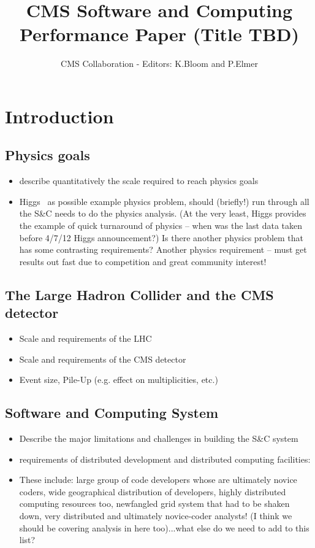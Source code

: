 \documentclass [draft,notitlepage] {article}
\title{CMS Software and Computing Performance Paper (Title TBD)}
\author{CMS Collaboration - Editors: K.Bloom and P.Elmer}
\begin{document}
\maketitle

\section{Introduction}

\subsection {Physics goals} 

\begin{itemize}
\item describe quantitatively the scale required to reach physics goals
\item Higgs~\cite{CMSHIGGS} as possible example physics problem, should (briefly!) run through all the S\&C needs to do the physics analysis.  (At the very least, Higgs provides the example of quick turnaround of physics -- when was the last data taken before 4/7/12 Higgs announcement?)  Is there another physics problem that has some contrasting requirements?  Another physics requirement -- must get results out fast due to competition and great community interest!
\end{itemize}

\subsection{The Large Hadron Collider and the CMS detector}

\begin{itemize}
\item Scale and requirements of the LHC
\item Scale and requirements of the CMS detector
\item Event size, Pile-Up (e.g. effect on multiplicities, etc.)
\end{itemize}

\subsection{Software and Computing System} 

\begin{itemize}
\item Describe the major limitations and challenges in building the S\&C system
\item requirements of distributed development and distributed computing facilities:
\item These include: large group of code developers whose are ultimately novice coders, wide geographical distribution of developers, highly distributed computing resources too, newfangled grid system that had to be shaken down, very distributed and ultimately novice-coder analysts! (I think we should be covering analysis in here too)...what else do we need to add to this list?
\end{itemize}
\end{document}
